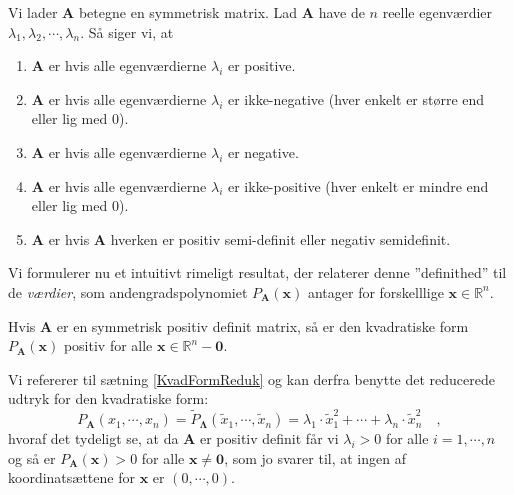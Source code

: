 \begin{definition} \label{defDefinithed}
Vi lader $\mathbf{A}$ betegne en symmetrisk matrix.
Lad $\mathbf{A}$ have de $n$ reelle egenværdier $\lambda_{1}, \lambda_{2}, \cdots, \lambda_{n}$. Så siger vi, at
\begin{enumerate}
\item $\mathbf{A}$ er  hvis alle egenværdierne $\lambda_{i}$  er positive.
\item $\mathbf{A}$ er  hvis alle egenværdierne  $\lambda_{i}$ er ikke-negative (hver enkelt er større end eller lig med $0$).
\item $\mathbf{A}$ er  hvis alle egenværdierne $\lambda_{i}$ er negative.
\item $\mathbf{A}$ er  hvis alle egenværdierne $\lambda_{i}$ er ikke-positive (hver enkelt er mindre end eller lig med $0$).
\item $\mathbf{A}$ er  hvis $\mathbf{A}$ hverken er positiv semi-definit eller negativ semidefinit.
\end{enumerate}
\end{definition}


Vi formulerer nu et intuitivt rimeligt resultat, der relaterer denne ''definithed'' til de {\emph{værdier}}, som andengradspolynomiet $P_{\mathbf{A}}(\mathbf{x})$ antager for forskelllige $\mathbf{x} \in \mathbb{R}^{n}$.



\begin{theorem} \label{thmPosDef}
Hvis $\mathbf{A}$ er en symmetrisk positiv definit matrix, så er den kvadratiske form $P_{\mathbf{A}}(\mathbf{x})$ positiv for alle $\mathbf{x} \in \mathbb{R}^{n} - \mathbf{0}$.
\end{theorem}
\begin{bevis}
Vi refererer til sætning \ref{KvadFormReduk} og kan derfra benytte det reducerede udtryk for den kvadratiske form:
\begin{equation}
P_{\mathbf{A}}(x_{1}, \cdots , x_{n}) = \widetilde{P}_{\bm{\Lambda}}(\widetilde{x}_{1}, \cdots , \widetilde{x}_{n})  = \lambda_{1}\cdot \widetilde{x}_{1}^{2} + \cdots + \lambda_{n}\cdot \widetilde{x}_{n}^{2} \quad,
\end{equation}
hvoraf det tydeligt se, at da $\mathbf{A}$ er positiv definit får vi $\lambda_{i} >0 $ for alle $i = 1, \cdots , n$ og så er $P_{\mathbf{A}}(\mathbf{x}) > 0$ for alle $\mathbf{x} \neq \mathbf{0}$, som jo svarer til, at ingen af koordinatsættene for $\mathbf{x}$ er $(0, \cdots , 0)$.
\end{bevis}

